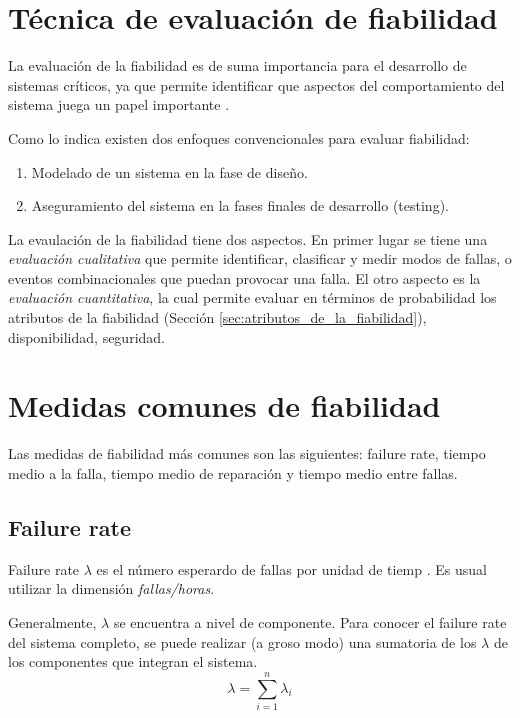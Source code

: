 \section{Técnica de evaluación de fiabilidad}
La evaluación de la fiabilidad es de suma importancia para el desarrollo de sistemas críticos, ya 
que permite identificar que aspectos del comportamiento del sistema juega un papel importante 
\citep{FTDesign}.

Como lo indica \cite{FTDesign} existen dos enfoques convencionales para evaluar fiabilidad:
\begin{enumerate}
 \item Modelado de un sistema en la fase de diseño. 
 \item Aseguramiento del sistema en la fases finales de desarrollo (testing).
\end{enumerate}

La evaulación de la fiabilidad tiene dos aspectos. En primer lugar se tiene una \textit{evaluación 
cualitativa} que permite identificar, clasificar y medir modos de fallas, o eventos combinacionales 
que puedan provocar una falla. El otro aspecto es la \textit{evaluación cuantitativa}, la cual 
permite evaluar en términos de probabilidad los atributos de la fiabilidad 
(Sección \ref{sec:atributos_de_la_fiabilidad}), disponibilidad, seguridad.

\section{Medidas comunes de fiabilidad}
Las medidas de fiabilidad más comunes son las siguientes: failure rate, tiempo medio a la falla, 
tiempo medio de reparación y tiempo medio entre fallas.

\subsection{Failure rate}
Failure rate $\lambda$ es el número esperardo de fallas por unidad de tiemp \citep{FTDesign}. Es 
usual utilizar la dimensión \textit{fallas/horas}.

Generalmente, $\lambda$ se encuentra a nivel de componente. Para conocer el failure rate del 
sistema completo, se puede realizar (a groso modo) una sumatoria de los $\lambda$ de los 
componentes que integran el sistema. $$\lambda=\sum_{i=1}^{n} \lambda_i$$

